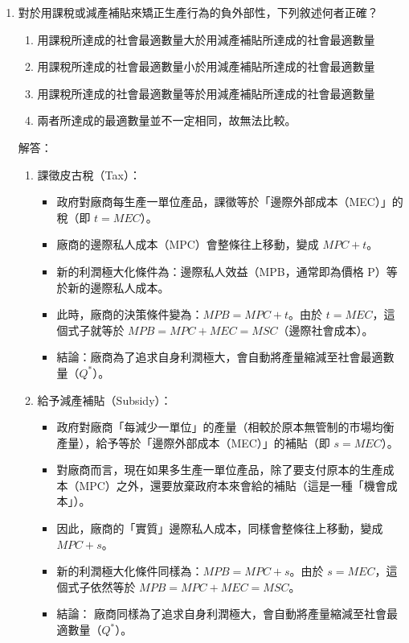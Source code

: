 \documentclass[12pt, a4paper]{article}
\begin{document}
\begin{enumerate}
    \item 對於用課稅或減產補貼來矯正生產行為的負外部性，下列敘述何者正確？
    \begin{enumerate}[label=\Alph*.]
        \item 用課稅所達成的社會最適數量大於用減產補貼所達成的社會最適數量
        \item 用課稅所達成的社會最適數量小於用減產補貼所達成的社會最適數量
        \item 用課稅所達成的社會最適數量等於用減產補貼所達成的社會最適數量
        \item 兩者所達成的最適數量並不一定相同，故無法比較。
    \end{enumerate}
    解答：
    \begin{enumerate}
        \item 課徵皮古稅（Tax）：
        \begin{itemize}
            \item 政府對廠商每生產一單位產品，課徵等於「邊際外部成本（MEC）」的稅（即 \(t = MEC\)）。
            \item 廠商的邊際私人成本（MPC）會整條往上移動，變成 \(MPC + t\)。
            \item 新的利潤極大化條件為：邊際私人效益（MPB，通常即為價格 P）等於新的邊際私人成本。
            \item 此時，廠商的決策條件變為：\(MPB = MPC + t\)。由於 \(t = MEC\)，這個式子就等於 \(MPB = MPC + MEC = MSC\)（邊際社會成本）。
            \item 結論：廠商為了追求自身利潤極大，會自動將產量縮減至社會最適數量（\(Q^*\)）。
        \end{itemize}
        \item 給予減產補貼（Subsidy）：
        \begin{itemize}
            \item 政府對廠商「每減少一單位」的產量（相較於原本無管制的市場均衡產量），給予等於「邊際外部成本（MEC）」的補貼（即 \(s = MEC\)）。
            \item 對廠商而言，現在如果多生產一單位產品，除了要支付原本的生產成本（MPC）之外，還要放棄政府本來會給的補貼（這是一種「機會成本」）。
            \item 因此，廠商的「實質」邊際私人成本，同樣會整條往上移動，變成 \(MPC + s\)。
            \item 新的利潤極大化條件同樣為：\(MPB = MPC + s\)。由於 \(s = MEC\)，這個式子依然等於 \(MPB = MPC + MEC = MSC\)。
            \item 結論： 廠商同樣為了追求自身利潤極大，會自動將產量縮減至社會最適數量（\(Q^*\)）。
        \end{itemize}
    \end{enumerate}


\end{enumerate}
\end{document}
